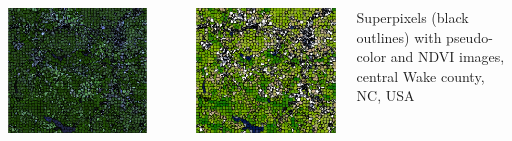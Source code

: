 \documentclass[25pt, margin=0mm, innermargin=25mm, blockverticalspace=25mm, colspace=25mm, subcolspace=8mm]{tikzposter}
\begin{document}
\begin{columns}
{\vspace*{0.7cm}

\begin{minipage}{0.5\linewidth}
\begin{center}
\includegraphics[width=\textwidth]{superpixels_slic_pseudo}
\end{center}
\end{minipage}
~
\begin{minipage}{0.5\linewidth}
\begin{center}
\includegraphics[width=\textwidth]{superpixels_slic_colored}
\end{center}
\end{minipage}
\vspace{2mm}
\begin{center}
Superpixels (black outlines) with pseudo-color and NDVI images, central Wake county, NC, USA
\end{center}

}
\end{columns}
\end{document}
